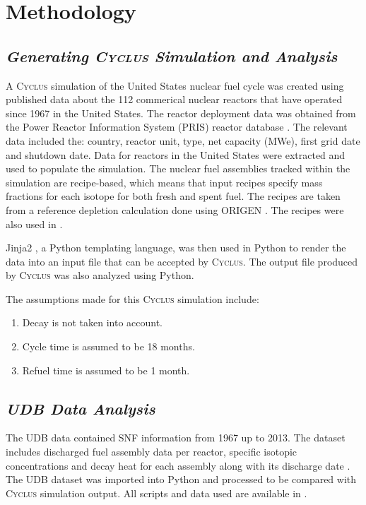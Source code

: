 \documentclass{anstrans}
\newcommand{\Cyclus}{\textsc{Cyclus}\xspace}%
\begin{document}
\section{Methodology}
\subsection{\textit{Generating \Cyclus Simulation and Analysis}}
A \Cyclus simulation of the United States nuclear fuel cycle was created using published data about the 112 commerical nuclear reactors that have operated since 1967 in the United States. The reactor deployment data was obtained from the Power Reactor Information System (PRIS) reactor database \cite{IAEA_pris_2017}. The relevant data included the: country, reactor unit, type, net capacity (MWe), first grid date and shutdown date. Data for reactors in the United States were extracted and used to populate the simulation. The nuclear fuel assemblies tracked within the simulation are recipe-based, which means that input recipes specify mass fractions for each isotope for both fresh and spent fuel. The recipes are taken from a reference depletion calculation done using ORIGEN \cite{bell_origen_1973}. The recipes were also used in \cite{wilson_adoption_2009, bae_synergistic_2017}. 

Jinja2 \cite{ronacher_welcome_2018}, a Python templating language, was then used in Python to render the data into an input file that can be accepted by \Cyclus. The output file produced by \Cyclus was also analyzed using Python. 

The assumptions made for this \Cyclus simulation include: 

\begin{enumerate}
	\item Decay is not taken into account. 
	\item Cycle time is assumed to be 18 months. 
	\item Refuel time is assumed to be 1 month. 
\end{enumerate}


\subsection{\textit{UDB Data Analysis}}
The UDB data contained SNF information from 1967 up to 2013. The dataset includes discharged fuel assembly data per reactor, specific isotopic concentrations and decay heat for each assembly along with its discharge date \cite{peterson_unf-st&dards_2017}. The UDB dataset was imported into Python and processed to be compared with \Cyclus simulation output. All scripts and data used are available in \cite{chee_arfc/transition-scenarios_2018}. 
\end{document}
